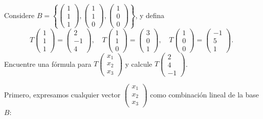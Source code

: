 \begin{prob}
Considere $B=\left\lbrace \begin{pmatrix} 1 \\ 1 \\ 1 \end{pmatrix}, \begin{pmatrix} 1 \\ 1 \\ 0 \end{pmatrix}, \begin{pmatrix} 1 \\ 0 \\ 0 \end{pmatrix} \right\rbrace$, y defina
\[
T\begin{pmatrix} 1 \\ 1 \\ 1 \end{pmatrix} = \begin{pmatrix} 2 \\ -1 \\ 4 \end{pmatrix}, \quad
T\begin{pmatrix} 1 \\ 1 \\ 0 \end{pmatrix} = \begin{pmatrix} 3 \\ 0 \\ 1 \end{pmatrix}, \quad
T\begin{pmatrix} 1 \\ 0 \\ 0 \end{pmatrix} = \begin{pmatrix} -1 \\ 5 \\ 1 \end{pmatrix}.
\]
Encuentre una fórmula para $T\begin{pmatrix} x_1 \\ x_2 \\ x_3 \end{pmatrix}$ y calcule $T\begin{pmatrix} 2 \\ 4 \\ -1 \end{pmatrix}$.
\begin{myproof}
Primero, expresamos cualquier vector $\begin{pmatrix} x_1 \\ x_2 \\ x_3 \end{pmatrix}$ como combinación lineal de la base $B$:

\end{myproof}
\end{prob}
